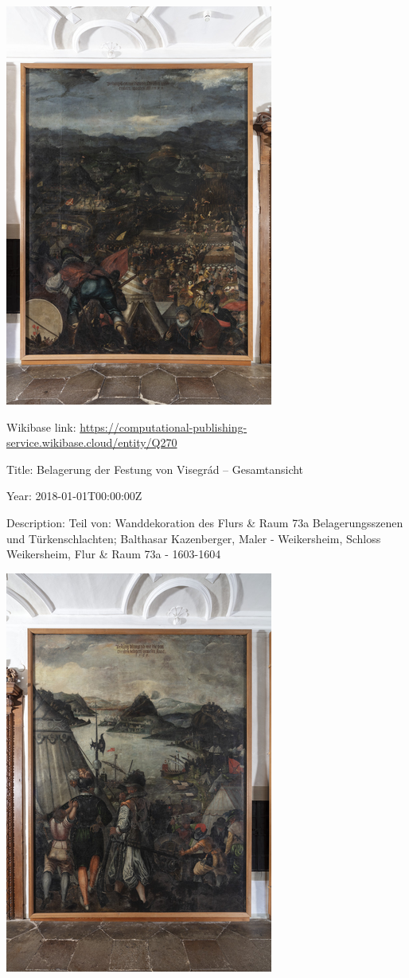 \documentclass[
  letterpaper,
]{book}
\begin{document}
\includegraphics{paintings_files/figure-pdf/cell-3-output-88.png}

Wikibase link:
\url{https://computational-publishing-service.wikibase.cloud/entity/Q270}

Title: Belagerung der Festung von Visegrád -- Gesamtansicht

Year: 2018-01-01T00:00:00Z

Description: Teil von: Wanddekoration des Flurs \& Raum 73a
Belagerungsszenen und Türkenschlachten; Balthasar Kazenberger, Maler -
Weikersheim, Schloss Weikersheim, Flur \& Raum 73a - 1603-1604

\includegraphics{paintings_files/figure-pdf/cell-3-output-90.png}
\end{document}

